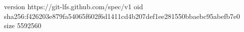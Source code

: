 version https://git-lfs.github.com/spec/v1
oid sha256:f426203e879fa54065f602f6d1411cd4b207def1ee281550bbaebc95abefb7e0
size 5592560
